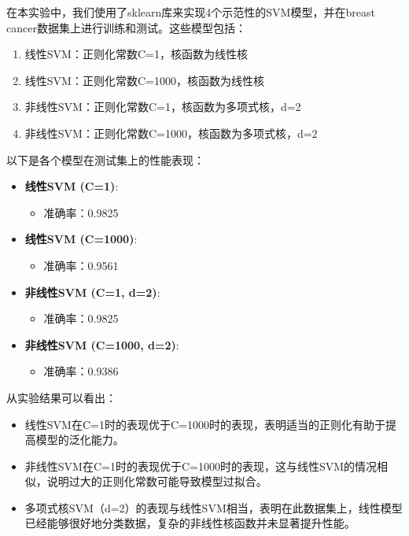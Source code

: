 \documentclass[12pt]{article}
\begin{document}
在本实验中，我们使用了sklearn库来实现4个示范性的SVM模型，并在breast cancer数据集上进行训练和测试。这些模型包括：

\begin{enumerate}
  \item 线性SVM：正则化常数C=1，核函数为线性核
  \item 线性SVM：正则化常数C=1000，核函数为线性核
  \item 非线性SVM：正则化常数C=1，核函数为多项式核，d=2
  \item 非线性SVM：正则化常数C=1000，核函数为多项式核，d=2
\end{enumerate}

以下是各个模型在测试集上的性能表现：

\begin{itemize}
  \item \textbf{线性SVM (C=1)}:
        \begin{itemize}
          \item 准确率：0.9825
        \end{itemize}

  \item \textbf{线性SVM (C=1000)}:
        \begin{itemize}
          \item 准确率：0.9561
        \end{itemize}

  \item \textbf{非线性SVM (C=1, d=2)}:
        \begin{itemize}
          \item 准确率：0.9825
        \end{itemize}

  \item \textbf{非线性SVM (C=1000, d=2)}:
        \begin{itemize}
          \item 准确率：0.9386
        \end{itemize}
\end{itemize}

从实验结果可以看出：
\begin{itemize}
  \item 线性SVM在C=1时的表现优于C=1000时的表现，表明适当的正则化有助于提高模型的泛化能力。
  \item 非线性SVM在C=1时的表现优于C=1000时的表现，这与线性SVM的情况相似，说明过大的正则化常数可能导致模型过拟合。
  \item 多项式核SVM（d=2）的表现与线性SVM相当，表明在此数据集上，线性模型已经能够很好地分类数据，复杂的非线性核函数并未显著提升性能。
\end{itemize}
\end{document}
